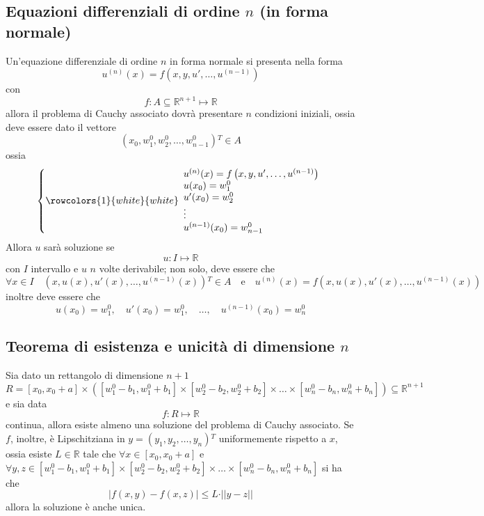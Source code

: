 \documentclass[a4paper]{extarticle}
\begin{document}
\subsection{Equazioni differenziali di ordine $n$ (in forma normale)}
Un'equazione differenziale di ordine $n$ in forma normale si presenta nella forma
\[u^{(n)}(x) = f \left(x,y,u',\dots,u^{(n-1)}\right)\]
con
\[f : A \subseteq \mathbb{R}^{n+1} \longmapsto \mathbb{R}\]
allora il problema di Cauchy associato dovrà presentare $n$ condizioni iniziali, ossia deve essere dato il vettore
\[(x_0,w_1^0,w_2^0,\dots,w_{n-1}^0){^T} \in A\]
ossia
\[\left\{
    \rowcolors{1}{white}{white}
    \begin{array}{lll}
        u^{(n)}(x) = f \left(x,y,u',\dots,u^{(n-1)}\right)\\
        u(x_0)=w_1^0\\
        u'(x_0)=w_2^0\\
        \vdots\\
        u^{(n-1)}(x_0)=w_{n-1}^0
    \end{array}
\right.\]
Allora $u$ sarà soluzione se
\[u : I \longmapsto \mathbb{R}\]
con $I$ intervallo e $u$ $n$ volte derivabile; non solo, deve essere che
\[\forall x \in I \hspace{1em} (x,u(x),u'(x),\dots,u^{(n-1)}(x)){^T} \in A \hspace{1em} \text{e} \hspace{1em} u^{(n)}(x)=f(x,u(x),u'(x),\dots,u^{(n-1)}(x))\]
inoltre deve essere che
\[u(x_0)=w_1^0, \hspace{1em} u'(x_0)=w_1^0, \hspace{1em} \dots, \hspace{1em} u^{(n-1)}(x_0) = w^0_n\]

\vspace{1em}
\subsection{Teorema di esistenza e unicità di dimensione $n$}
Sia dato un rettangolo di dimensione $n+1$
\[R = [x_0,x_0+a] \times \left(\left[w_1^0-b_1,w_1^0+b_1\right] \times \left[w_2^0-b_2,w_2^0+b_2\right]\times \dots \times \left[w_n^0-b_n,w_n^0+b_n\right]\right) \subseteq \mathbb{R}^{n+1}\]
e sia data
\[f : R \longmapsto \mathbb{R}\]
continua, allora esiste almeno una soluzione del problema di Cauchy associato. Se $f$, inoltre, è Lipschitziana in $y=(y_1,y_2,\dots,y_n){^T}$ uniformemente rispetto a $x$, ossia esiste $L \in \mathbb{R}$ tale che $\forall x \in [x_0,x_0+a]$ e $\forall y,z \in \left[w_1^0-b_1,w_1^0+b_1\right] \times \left[w_2^0-b_2,w_2^0+b_2\right]\times \dots \times \left[w_n^0-b_n,w_n^0+b_n\right]$ si ha che
\[\vert f(x,y) - f(x,z) \vert \leq L \cdot \vert\vert y-z \vert\vert\]
allora la soluzione è anche unica.
\end{document}

